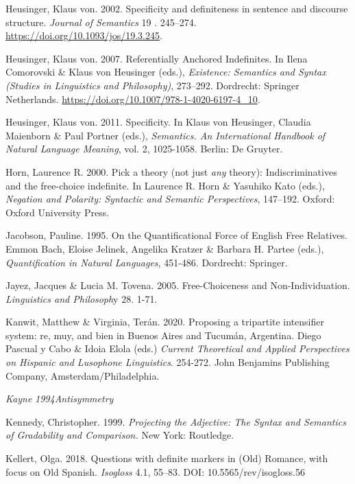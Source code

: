 \documentclass[output=paper]{langscibook}
\begin{document}
Heusinger, Klaus von. 2002. Specificity and definiteness in sentence and discourse structure. \textit{Journal of Semantics} 19 . 245–274. \url{https://doi.org/10.1093/jos/19.3.245}.

Heusinger, Klaus von. 2007. Referentially Anchored Indefinites. In Ilena Comorovski \& Klaus von Heusinger (eds.), \textit{Existence: Semantics and Syntax} \textit{(Studies in Linguistics and Philosophy)}, 273–292. Dordrecht: Springer Netherlands. \url{https://doi.org/10.1007/978-1-4020-6197-4_10}. 

Heusinger, Klaus von. 2011. Specificity. In Klaus von Heusinger, Claudia Maienborn \& Paul Portner (eds.), \textit{Semantics. An International Handbook of Natural Language Meaning}, vol. 2, 1025-1058. Berlin: De Gruyter.

Horn, Laurence R. 2000. Pick a theory (not just \textit{any} theory): Indiscriminatives and the free-choice indefinite. In Laurence R. Horn \& Yasuhiko Kato (eds.), \textit{Negation and Polarity: Syntactic and Semantic Perspectives}, 147–192. Oxford: Oxford University Press.

Jacobson, Pauline. 1995. On the Quantificational Force of English Free Relatives. Emmon Bach, Eloise Jelinek, Angelika Kratzer \& Barbara H. Partee (eds.), \textit{Quantification in Natural Languages}, 451-486. Dordrecht: Springer.

Jayez, Jacques \& Lucia M. Tovena. 2005. Free-Choiceness and Non-Individuation. \textit{Linguistics and Philosoph}y 28. 1-71. 

Kanwit, Matthew \& Virginia, Terán. 2020. Proposing a tripartite intensifier system: re, muy, and bien in Buenos Aires and Tucumán, Argentina. Diego Pascual y Cabo \& Idoia Elola (eds.) \textit{Current Theoretical and Applied Perspectives on Hispanic and Lusophone Linguistics}. 254-272. John Benjamins Publishing Company, Amsterdam/Philadelphia.

\emph{\textmd{Kayne}} \emph{\textmd{1994}}\emph{\textmd{Antisymmetry}}

Kennedy, Christopher. 1999. \textit{Projecting the Adjective: The Syntax and Semantics of Gradability and Comparison.} New York: Routledge.

Kellert, Olga. 2018. Questions with definite markers in (Old) Romance, with focus on Old Spanish. \textit{Isogloss} 4.1, 55–83. DOI: 10.5565/rev/isogloss.56
\end{document}
